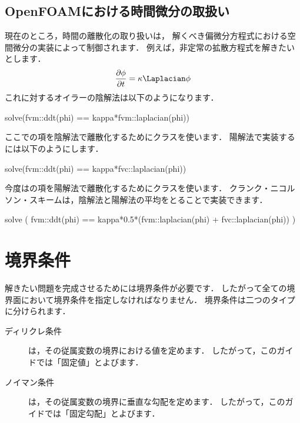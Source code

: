 \subsection{OpenFOAMにおける時間微分の取扱い}
\label{ssec:2.5.1}
現在のところ，時間の離散化の取り扱いは，
解くべき偏微分方程式における空間微分の実装によって制御されます．
例えば，非定常の拡散方程式を解きたいとします．
\begin{align}
 \label{eq:2.37}
 \frac{\partial\phi}{\partial t} = \kappa\Laplacian\phi
\end{align}
これに対するオイラーの陰解法は以下のようになります．
\begin{OFverbatim}[file]
solve(fvm::ddt(phi) == kappa*fvm::laplacian(phi))
\end{OFverbatim}
ここでの項を陰解法で離散化するためにクラスを使います．
陽解法で実装するには以下のようにします．
\begin{OFverbatim}[file]
solve(fvm::ddt(phi) == kappa*fvc::laplacian(phi))
\end{OFverbatim}
今度はの項を陽解法で離散化するためにクラスを使います．
クランク・ニコルソン・スキームは，陰解法と陽解法の平均をとることで実装できます．
\begin{OFverbatim}[file]
solve
    (
    fvm::ddt(phi)
    ==
    kappa*0.5*(fvm::laplacian(phi) + fvc::laplacian(phi))
    )
\end{OFverbatim}



\section{境界条件}
\label{sec:2.6}
解きたい問題を完成させるためには境界条件が必要です．
したがって全ての境界面において境界条件を指定しなければなりません．
境界条件は二つのタイプに分けられます．
\begin{description}
 \item[ディリクレ条件] は，その従属変数の境界における値を定めます．
            したがって，このガイドでは「固定値」とよびます．
 \item[ノイマン条件] は，その従属変数の境界に垂直な勾配を定めます．
            したがって，このガイドでは「固定勾配」とよびます．
\end{description}

